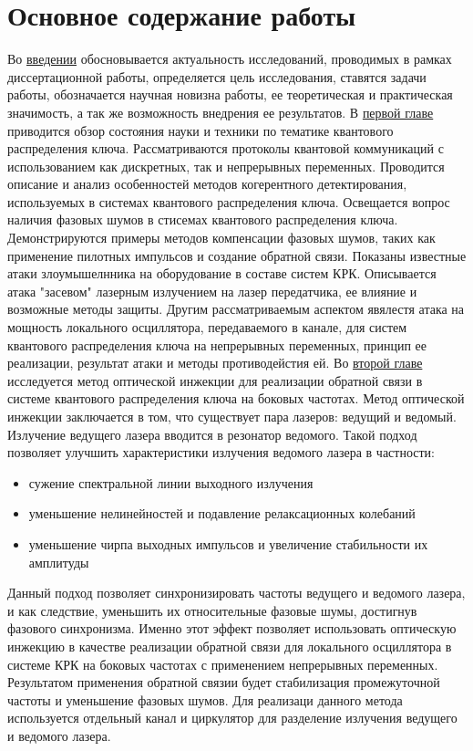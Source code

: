 \section*{Основное содержание работы }
Во \underline{введении} обосновывается актуальность исследований, проводимых в рамках диссертационной работы, определяется цель исследования, ставятся задачи работы, обозначается научная новизна работы, ее теоретическая и практическая значимость, а так же возможность внедрения ее результатов. 
\newline В \underline{первой главе} приводится обзор состояния науки и техники по тематике квантового распределения ключа. Рассматриваются протоколы квантовой коммуникаций с использованием как дискретных, так и непрерывных переменных. Проводится описание и анализ особенностей методов когерентного детектирования, используемых в системах квантового распределения ключа. Освещается вопрос наличия фазовых шумов в стисемах квантового распределения ключа. Демонстрируются примеры методов компенсации фазовых шумов, таких как применение пилотных импульсов и создание обратной связи.  Показаны известные атаки злоумышелнника на оборудование в составе систем КРК. Описывается атака "засевом" лазерным излучением на лазер передатчика, ее влияние и возможные методы защиты. Другим рассматриваемым аспектом явялестя атака на мощность локального осциллятора, передаваемого в канале, для систем квантового распределения ключа на непрерывных переменных, принцип ее реализации, результат атаки и методы противодейстия ей. 
Во \underline{второй главе} исследуется метод оптической инжекции для реализации обратной связи в системе квантового распределения ключа на боковых частотах. Метод оптической инжекции заключается в том, что существует пара лазеров: ведущий и ведомый. Излучение ведущего лазера вводится в резонатор ведомого. Такой подход позволяет улучшить характеристики излучения ведомого лазера в частности:
\begin{itemize}
    \item сужение спектральной линии выходного излучения
    \item уменьшение нелинейностей и подавление релаксационных колебаний
    \item уменьшение чирпа выходных импульсов и увеличение стабильности их амплитуды
\end{itemize}
Данный подход позволяет синхронизировать частоты ведущего и ведомого лазера, и как следствие, уменьшить их относительные фазовые шумы, достигнув фазового синхронизма. Именно этот эффект позволяет использовать оптическую инжекцию в качестве реализации обратной связи для локального осциллятора в системе КРК на боковых частотах с применением непрерывных переменных. Результатом применения обратной связии будет стабилизация промежуточной частоты и уменьшение фазовых шумов. Для реализаци данного метода используется отдельный канал и циркулятор для разделение излучения ведущего и ведомого лазера. 
